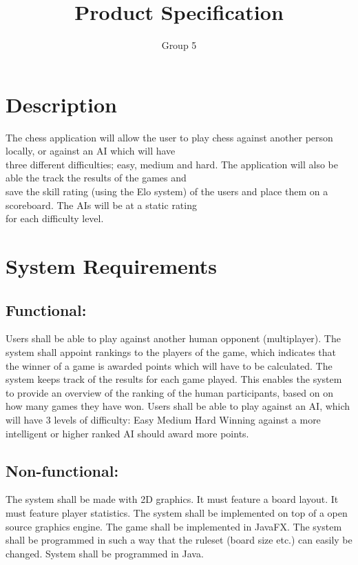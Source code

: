 \documentclass{article}
\title{Product Specification}
\author{Group 5}
\date{}
\begin{document}
    \maketitle
    
    \section{Description}
    The chess application will allow the user to play chess against another person locally, or against an AI which will have \\
    three different difficulties; easy, medium and hard. The application will also be able the track the results of the games and \\
    save the skill rating (using the Elo system) of the users and place them on a scoreboard. The AIs will be at a static rating \\
    for each difficulty level.
    
    \section{System Requirements} 
    \subsection{Functional:}
    \begin{outline}
          \1 Users shall be able to play against another human opponent (multiplayer).
          \1 The system shall appoint rankings to the players of the game, which indicates 
             that the winner of a game is awarded points which will have to be calculated.
          \1 The system keeps track of the results for each game played.
          \2 This enables the system to provide an overview of the ranking of the human participants,
             based on on how many games they have won.
          \1 Users shall be able to play against an AI, which will have 3 levels of difficulty:
          \2 Easy
          \2 Medium
          \2 Hard
          \1 Winning against a more intelligent or higher ranked AI should award more points.
     \end{outline}
     
    \subsection{Non-functional:}
    \begin{outline}
          \1 The system shall be made with 2D graphics.
          \2 It must feature a board layout.
          \2 It must feature player statistics.
          \1 The system shall be implemented on top of a open source graphics engine.
          \2 The game shall be implemented in JavaFX.
          \1 The system shall be programmed in such a way that the ruleset (board size etc.) can easily be changed.
          \1 System shall be programmed in Java.
    \end{outline}
    
\end{document}
